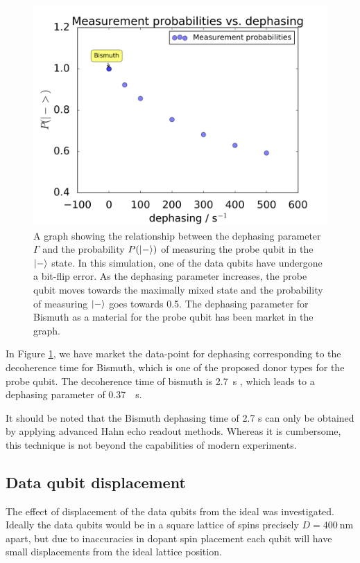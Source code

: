 \begin{figure}[!ht]
	\centering
	\includegraphics[width=\textwidth]{Figures/phase_graph.png}
		\caption{A graph showing the relationship between the dephasing parameter $\Gamma$ and the probability $P(\ket{-})$ of measuring the probe qubit in the $\ket{-}$ state. In this simulation, one of the data qubits have undergone a bit-flip error. As the dephasing parameter increases, the probe qubit moves towards the maximally mixed state and the probability of measuring $\ket{-}$ goes towards 0.5. The dephasing parameter for Bismuth as a material for the probe qubit has been market in the graph.}
		\label{fig:phaseplot}
\end{figure}


In Figure \ref{fig:phaseplot}, we have market the data-point for dephasing corresponding to the decoherence time for Bismuth, which is one of the proposed donor types for the probe qubit. The decoherence time of bismuth is \SI{2.7}{\second} \cite{Wolfowicz2013}, which leads to a dephasing parameter of \SI{0.37}{\per\second}. 


It should be noted that the Bismuth dephasing time of 2.7 s can only be obtained by applying advanced Hahn echo readout methods. Whereas it is cumbersome, this technique is not beyond the capabilities of modern experiments. 

\subsection{Data qubit displacement}
The effect of displacement of the data qubits from the ideal was investigated. Ideally the data qubits would be in a square lattice of spins precisely $D = \SI{400}{\nano\metre}$ apart, but due to inaccuracies in dopant spin placement each qubit will have small displacements from the ideal lattice position.

